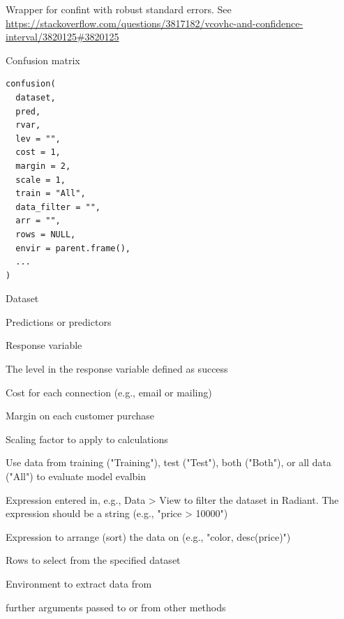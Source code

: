 \documentclass[a4paper]{book}
\begin{document}
%
\begin{Details}
Wrapper for confint with robust standard errors. See \url{https://stackoverflow.com/questions/3817182/vcovhc-and-confidence-interval/3820125\#3820125}
\end{Details}
%
\begin{Description}
Confusion matrix
\end{Description}
%
\begin{Usage}
\begin{verbatim}
confusion(
  dataset,
  pred,
  rvar,
  lev = "",
  cost = 1,
  margin = 2,
  scale = 1,
  train = "All",
  data_filter = "",
  arr = "",
  rows = NULL,
  envir = parent.frame(),
  ...
)
\end{verbatim}
\end{Usage}
%
\begin{Arguments}
\begin{ldescription}
\item[\code{dataset}] Dataset

\item[\code{pred}] Predictions or predictors

\item[\code{rvar}] Response variable

\item[\code{lev}] The level in the response variable defined as success

\item[\code{cost}] Cost for each connection (e.g., email or mailing)

\item[\code{margin}] Margin on each customer purchase

\item[\code{scale}] Scaling factor to apply to calculations

\item[\code{train}] Use data from training ("Training"), test ("Test"), both ("Both"), or all data ("All") to evaluate model evalbin

\item[\code{data\_filter}] Expression entered in, e.g., Data > View to filter the dataset in Radiant. The expression should be a string (e.g., "price > 10000")

\item[\code{arr}] Expression to arrange (sort) the data on (e.g., "color, desc(price)")

\item[\code{rows}] Rows to select from the specified dataset

\item[\code{envir}] Environment to extract data from

\item[\code{...}] further arguments passed to or from other methods
\end{ldescription}
\end{Arguments}
\end{document}
